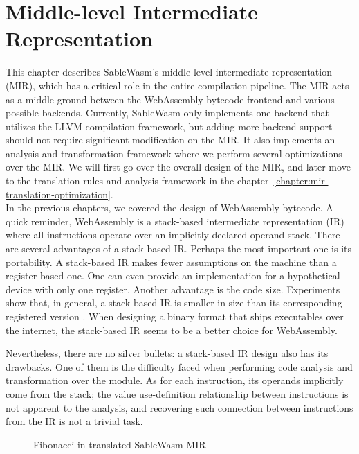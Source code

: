 \chapter{Middle-level Intermediate Representation}
\label{chapter:mir-design}

This chapter describes SableWasm's middle-level intermediate representation
(MIR), which has a critical role in the entire compilation pipeline. The MIR
acts as a middle ground between the WebAssembly bytecode frontend and various
possible backends. Currently, SableWasm only implements one backend that
utilizes the LLVM compilation framework, but adding more backend support should
not require significant modification on the MIR. It also implements an
analysis and transformation framework where we perform several optimizations
over the MIR. We will first go over the overall design of the MIR, and
later move to the translation rules and analysis framework in the
chapter~\ref{chapter:mir-translation-optimization}. \\[12pt]


In the previous chapters, we covered the design of WebAssembly bytecode. A quick
reminder, WebAssembly is a stack-based intermediate representation (IR) where
all instructions operate over an implicitly declared operand stack. There are
several advantages of a stack-based IR. Perhaps the most important one is its
portability. A stack-based IR makes fewer assumptions on the machine than a
register-based one. One can even provide an implementation for a hypothetical
device with only one register. Another advantage is the code size. Experiments
show that, in general, a stack-based IR is smaller in size than its
corresponding registered version \cite{stack-and-register-vm}. When designing a
binary format that ships executables over the internet, the stack-based IR seems
to be a better choice for WebAssembly.

Nevertheless, there are no silver bullets: a stack-based IR design also has its
drawbacks. One of them is the difficulty faced when performing code analysis and
transformation over the module. As for each instruction, its operands implicitly
come from the stack; the value use-definition relationship between instructions
is not apparent to the analysis, and recovering such connection between
instructions from the IR is not a trivial task.

\begin{figure}
    \centering
    
    \caption{Fibonacci in translated SableWasm MIR}
    \label{fig:mir-fibonacci}
\end{figure}

